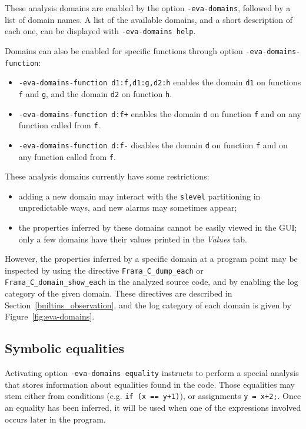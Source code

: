 \documentclass{frama-c-book}
\begin{document}
These analysis domains are enabled by the option \texttt{-eva-domains}, followed
by a list of domain names. A list of the available domains, and a short
description of each one, can be displayed with \texttt{-eva-domains help}.

Domains can also be enabled for specific functions through option
\texttt{-eva-domains-function}:
\begin{itemize}
\item \texttt{-eva-domains-function d1:f,d1:g,d2:h} enables the domain
  \texttt{d1} on functions \lstinline+f+ and \lstinline+g+, and the domain
  \texttt{d2} on function \lstinline+h+.
\item \texttt{-eva-domains-function d:f+} enables the domain
  \texttt{d} on function \lstinline+f+ and on any function called
  from \lstinline+f+.
\item \texttt{-eva-domains-function d:f-} disables the domain
  \texttt{d} on function \lstinline+f+ and on any function called
  from \lstinline+f+.
\end{itemize}

These analysis domains currently have some restrictions:
\begin{itemize}
\item adding a new domain may interact with the \lstinline+slevel+ partitioning
  in unpredictable ways, and new alarms may sometimes appear;
\item the properties inferred by these domains cannot be easily viewed in the
  GUI; only a few domains have their values printed in the \emph{Values} tab.
\end{itemize}

However, the properties inferred by a specific domain at a program point may be
inspected by using the directive \lstinline+Frama_C_dump_each+ or
\lstinline+Frama_C_domain_show_each+ in the analyzed source code, and by
enabling the log category of the given domain. These directives are described
in Section~\ref{builtins_observation}, and the log category of each domain
is given by Figure~\ref{fig:eva-domains}.

\subsection{Symbolic equalities}
\label{sec:symbolic-equalities}

Activating option \texttt{-eva-domains equality} instructs
\Eva{} to perform a special analysis that stores information
about equalities found in the code. Those equalities may stem either
from conditions (e.g. \texttt{if (x == y+1)}), or assignments
\texttt{y = x+2;}. Once an equality has been inferred, it will
be used when one of the expressions involved occurs later in the program.
\end{document}
